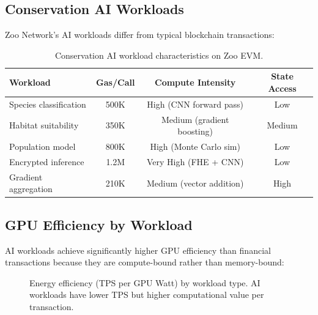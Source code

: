 \documentclass[11pt,letterpaper]{article}
\begin{document}
\subsection{Conservation AI Workloads}

Zoo Network's AI workloads differ from typical blockchain transactions:

\begin{table}[t]
\centering
\begin{tabular}{lccc}
\toprule
\textbf{Workload} & \textbf{Gas/Call} & \textbf{Compute Intensity} & \textbf{State Access} \\
\midrule
Species classification & 500K & High (CNN forward pass) & Low \\
Habitat suitability & 350K & Medium (gradient boosting) & Medium \\
Population model & 800K & High (Monte Carlo sim) & Low \\
Encrypted inference & 1.2M & Very High (FHE + CNN) & Low \\
Gradient aggregation & 210K & Medium (vector addition) & High \\
\bottomrule
\end{tabular}
\caption{Conservation AI workload characteristics on Zoo EVM.}
\label{tab:ai-workloads}
\end{table}

\subsection{GPU Efficiency by Workload}

AI workloads achieve significantly higher GPU efficiency than financial transactions because they are compute-bound rather than memory-bound:

\begin{figure}[t]
\centering
{}
\caption{Energy efficiency (TPS per GPU Watt) by workload type. AI workloads have lower TPS but higher computational value per transaction.}
\label{fig:efficiency}
\end{figure}
\end{document}
